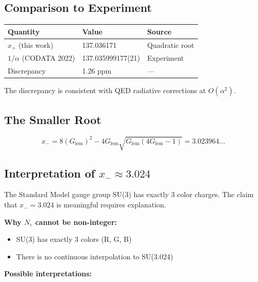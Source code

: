 \documentclass[11pt,a4paper]{article}
\theoremstyle{definition}
\theoremstyle{remark}
\newcommand{\Glem}{G_{\text{lem}}}
\begin{document}
\subsection{Comparison to Experiment}

\begin{center}
\begin{tabular}{lll}
\toprule
Quantity & Value & Source \\
\midrule
$x_+$ (this work) & 137.036171 & Quadratic root \\
$1/\alpha$ (CODATA 2022) & 137.035999177(21) & Experiment \\
Discrepancy & 1.26 ppm & --- \\
\bottomrule
\end{tabular}
\end{center}

The discrepancy is consistent with QED radiative corrections at $O(\alpha^2)$.

\subsection{The Smaller Root}

\begin{equation}
    x_- = 8(\Glem)^2 - 4\Glem\sqrt{\Glem(4\Glem - 1)} = 3.023964\ldots
\end{equation}

\subsection{Interpretation of \texorpdfstring{$x_- \approx 3.024$}{x- approx 3.024}}

The Standard Model gauge group SU(3) has exactly 3 color charges. The claim that $x_- = 3.024$ is meaningful requires explanation.

\textbf{Why $N_c$ cannot be non-integer:}
\begin{itemize}
    \item SU(3) has exactly 3 colors (R, G, B)
    \item There is no continuous interpolation to SU(3.024)
\end{itemize}

\textbf{Possible interpretations:}
\end{document}
